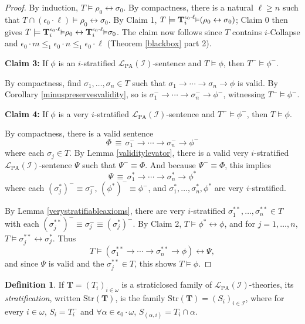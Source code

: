 \documentclass[reqno]{article}
\theoremstyle{definition}
\newtheorem{definition}[theorem]{Definition}
\def\L{\mathscr{L}}
\def\T{\mathbf{T}}
\def\LPA{\L_{\mathrm{PA}}}
\def\epom{\epsilon_0\cdot\omega}
\def\indset{\mathcal I}
\newcommand{\Prr}[2]{\T^{#1}_{#2}\mbox{\small${\vDash}$}}
\newcommand{\claim}[1]{\textbf{Claim #1:}}
\newcommand{\str}[1]{\mathrm{Str}(#1)} \newcommand{\Str}[1]{\str{#1}}
\begin{document}
\begin{proof}
By induction, $T\models\rho_0\leftrightarrow\sigma_0$.
By compactness, there is a natural $\ell\geq n$
such that $T\cap 
(\epsilon_0\cdot\ell)\models\rho_0\leftrightarrow\sigma_0$.
By Claim 1, $T\models 
\Prr{\epsilon_0\cdot\ell}i(\rho_0\leftrightarrow\sigma_0)$;
Claim 0 then gives $T\models \Prr{\epsilon_0\cdot\ell}i\rho_0
\leftrightarrow \Prr{\epsilon_0\cdot\ell}i\sigma_0$.
The claim now follows since $T$ contains $i$-Collapse
and $\epsilon_0\cdot m\leq_1\epsilon_0\cdot n\leq_1 \epsilon_0\cdot \ell$ (Theorem \ref{blackbox} part 2).

\item
\claim3
If $\phi$ is an $i$-stratified $\LPA(\indset)$-sentence
and $T\models\phi$, then $T^-\models\phi^-$.

\item
By compactness, find 
$\sigma_1,\ldots,\sigma_n\in T$ such that
$\sigma_1\rightarrow\cdots\rightarrow\sigma_n\rightarrow\phi$
is valid.
By Corollary \ref{minuspreservesvalidity},
so is $\sigma^-_1\rightarrow\cdots\rightarrow\sigma^-_n\rightarrow\phi^-$,
witnessing $T^-\models\phi^-$.

\item
\claim4
If $\phi$ is a very $i$-stratified $\LPA(\indset)$-sentence
and $T^-\models\phi^-$, then $T\models\phi$.

\item
By compactness,
there is a valid sentence
\[
\Phi\,\equiv\,\sigma^-_1\rightarrow\cdots\rightarrow\sigma^-_n\rightarrow\phi^-\]
where each $\sigma_j\in T$.
By Lemma \ref{validitylevator},
there is a valid very $i$-stratified $\LPA(\indset)$-sentence $\Psi$
such that $\Psi^-\equiv\Phi$.
And because $\Psi^-\equiv\Phi$, this implies
\[
\Psi\,\equiv\,\sigma^*_1\rightarrow\cdots\rightarrow\sigma^*_n\rightarrow\phi^*
\]
where each $(\sigma^*_j)^-\equiv\sigma^-_j$, $(\phi^*)^-\equiv\phi^-$,
and $\sigma^*_1,\ldots,\sigma^*_n,\phi^*$ are very $i$-stratified.

By Lemma \ref{verystratifiableaxioms},
there are very $i$-stratified
$\sigma^{**}_1,\ldots,\sigma^{**}_n\in T$ with each $(\sigma^{**}_j)^-\equiv \sigma^-_j\equiv (\sigma^*_j)^-$.
By Claim 2, $T\models\phi^*\leftrightarrow\phi$, and for $j=1,\ldots,n$, $T\models \sigma^{**}_j\leftrightarrow \sigma^*_j$.
Thus
\[
T\models (\sigma^{**}_1\rightarrow\cdots\rightarrow\sigma^{**}_n\rightarrow\phi)\leftrightarrow\Psi,
\]
and since $\Psi$ is valid and the $\sigma^{**}_j\in T$, this shows $T\models\phi$.
\end{proof}


\begin{definition}
\label{stratdefn}
If $\T=(T_i)_{i\in\omega}$ is a straticlosed family of $\LPA(\indset)$-theories,
its
\emph{stratification}, written $\str{\T}$,
is the family $\str{\T}=(S_i)_{i\in\indset}$, where for every $i\in\omega$,
$S_i=T^-_i$ and $\forall\alpha\in\epom$, $S_{(\alpha,i)}=T_i\cap\alpha$.
\end{definition}
\end{document}
